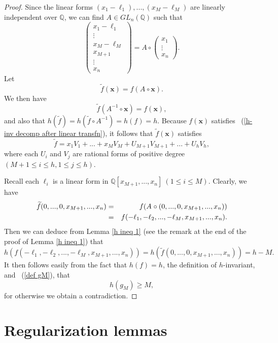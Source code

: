 \documentclass[12pt]{amsart}
\theoremstyle{definition}
\theoremstyle{remark}
\numberwithin{equation}{section}
\begin{document}
\begin{proof}
Since the linear forms $(x_1 - \ell_1), ... , (x_M - \ell_M)$ are linearly independent over $\mathbb{Q}$,
we can find $A \in GL_n(\mathbb{Q})$ such that
$$
\left( \begin{array}{c}
x_1 - \ell_1 \\
\vdots \\
x_M - \ell_M \\
x_{M+1} \\
\vdots \\
x_n \end{array} \right)
=
A \circ \left( \begin{array}{c}
x_1 \\
\vdots \\
x_n \end{array} \right).
$$
Let
$$
\widetilde{f} (\mathbf{x} )= f(A^{} \circ \mathbf{x} ).
$$
We then have
$$
\widetilde{f} (A^{-1} \circ \mathbf{x} )= f( \mathbf{x} ),
$$
and also that $h(\widetilde{f} ) = h(\widetilde{f} \circ A^{-1}  ) =  h(f) = h$.
Because $f(\mathbf{x})$ satisfies ~(\ref{h-inv decomp after linear transfn}),
it follows that $\widetilde{f} (\mathbf{x} )$ satisfies
$$
\widetilde{f} =  x_1 V_1 + ... + x_M V_M + U_{M+1} V_{M+1} + ... +  U_h V_h,
$$
where each $U_i$ and $V_j$ are rational forms of positive degree $(M+1 \leq i \leq h, 1 \leq j \leq h)$.

Recall each $\ell_i$ is a linear form in $\mathbb{Q}[x_{M+1}, ..., x_n] \ (1 \leq i \leq M)$.
Clearly, we have
\begin{eqnarray}
\widetilde{f} (0, ...,0, x_{M+1}, ...,  x_n ) &=&
f(A^{} \circ (0, ...,0, x_{M+1}, ...,  x_n ) )
\notag
\\
&=& f( -\ell_1, - \ell_2, ... , - \ell_M, x_{M+1}, ..., x_n ).
\notag
\end{eqnarray}
Then we can deduce from Lemma \ref{h ineq 1} (see the remark at the end of the proof of Lemma \ref{h ineq 1}) that
$$
h( f( -\ell_1, - \ell_2, ... , - \ell_M, x_{M+1}, ..., x_n ) )
= h(\widetilde{f} (0, ...,0, x_{M+1}, ...,  x_n )) = h-M.
$$
It then follows easily from the fact that $h(f) = h$, the definition of $h$-invariant, and ~(\ref{def gM}), that
$$
h(g_M) \geq M,
$$
for otherwise we obtain a contradiction.
\end{proof}

\section{Regularization lemmas}
\label{Sec reg lem}
\end{document}
